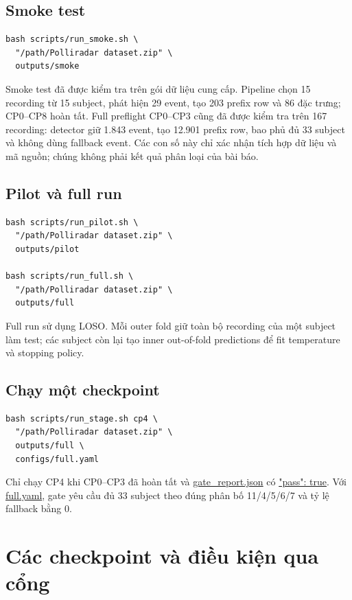 \documentclass[12pt,draftclsnofoot,onecolumn]{IEEEtran}
\newcommand{\code}[1]{\url{#1}}
\begin{document}
\subsection{Smoke test}

\begin{lstlisting}
bash scripts/run_smoke.sh \
  "/path/Polliradar dataset.zip" \
  outputs/smoke
\end{lstlisting}

Smoke test đã được kiểm tra trên gói dữ liệu cung cấp. Pipeline chọn 15 recording từ 15 subject, phát hiện 29 event, tạo 203 prefix row và 86 đặc trưng; CP0--CP8 hoàn tất. Full preflight CP0--CP3 cũng đã được kiểm tra trên 167 recording: detector giữ 1.843 event, tạo 12.901 prefix row, bao phủ đủ 33 subject và không dùng fallback event. Các con số này chỉ xác nhận tích hợp dữ liệu và mã nguồn; chúng không phải kết quả phân loại của bài báo.

\subsection{Pilot và full run}

\begin{lstlisting}
bash scripts/run_pilot.sh \
  "/path/Polliradar dataset.zip" \
  outputs/pilot

bash scripts/run_full.sh \
  "/path/Polliradar dataset.zip" \
  outputs/full
\end{lstlisting}

Full run sử dụng LOSO. Mỗi outer fold giữ toàn bộ recording của một subject làm test; các subject còn lại tạo inner out-of-fold predictions để fit temperature và stopping policy.

\subsection{Chạy một checkpoint}

\begin{lstlisting}
bash scripts/run_stage.sh cp4 \
  "/path/Polliradar dataset.zip" \
  outputs/full \
  configs/full.yaml
\end{lstlisting}

Chỉ chạy CP4 khi CP0--CP3 đã hoàn tất và \code{gate_report.json} có \code{"pass": true}. Với \code{full.yaml}, gate yêu cầu đủ 33 subject theo đúng phân bố 11/4/5/6/7 và tỷ lệ fallback bằng 0.

\section{Các checkpoint và điều kiện qua cổng}
\end{document}

